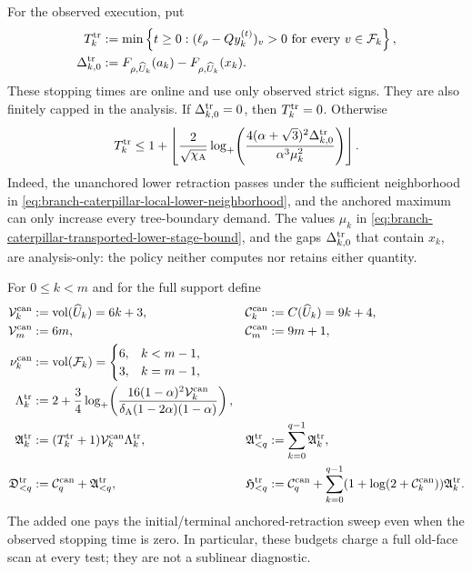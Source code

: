 For the observed execution, put
\begin{align}
 T_k^{\rm tr}
 &:=
 \min\left\{t\geq0:
  (\ell_\rho-Qy_k^{(t)})_v>0
  \text{ for every }v\in\mathcal F_k\right\},
 \notag\\
 \Delta_{k,0}^{\rm tr}
 &:=
 F_{\rho,\widehat U_k}(a_k)
 -F_{\rho,\widehat U_k}(x_k).
 \label{eq:branch-caterpillar-transported-lower-stopping-time}
\end{align}
These stopping times are online and use only observed strict signs.  They are
also finitely capped in the analysis.  If $\Delta_{k,0}^{\rm tr}=0$, then
$T_k^{\rm tr}=0$.  Otherwise
\begin{equation}
 T_k^{\rm tr}\leq
 1+\left\lfloor\frac{2}{\sqrt{\chi_{\rm A}}}
 \log_+\!\left(
 \frac{4(\alpha+\sqrt3)^2\Delta_{k,0}^{\rm tr}}
      {\alpha^3\mu_k^2}
           \right)\right\rfloor.
 \label{eq:branch-caterpillar-transported-lower-stage-bound}
\end{equation}
Indeed, the unanchored lower retraction passes under the sufficient
neighborhood in
\cref{eq:branch-caterpillar-local-lower-neighborhood}, and the anchored
maximum can only increase every tree-boundary demand.  The values $\mu_k$ in
\cref{eq:branch-caterpillar-transported-lower-stage-bound}, and the gaps
$\Delta_{k,0}^{\rm tr}$ that contain $x_k$, are analysis-only: the policy
neither computes nor retains either quantity.

For $0\leq k<m$ and for the full support define
\begin{align}
 \mathcal V_k^{\rm can}
 &:=\operatorname{vol}(\widehat U_k)=6k+3,
 &
 \mathcal C_k^{\rm can}
 &:=C(\widehat U_k)=9k+4,
 \notag\\
 \mathcal V_m^{\rm can}&:=6m,
 &
 \mathcal C_m^{\rm can}&:=9m+1,
 \notag\\
 \nu_k^{\rm can}
 &:=\operatorname{vol}(\mathcal F_k)
 =\begin{cases}6,&k<m-1,\\3,&k=m-1,\end{cases}
 \label{eq:branch-caterpillar-transported-lower-face-counts}\\
 \Lambda_k^{\rm tr}
 &:=2+\frac34\log_+\!\left(
  \frac{16(1-\alpha)^2\mathcal V_k^{\rm can}}
       {\delta_{\rm A}(1-2\alpha)(1-\alpha)}
                         \right),
 \notag\\
 \mathfrak A_k^{\rm tr}
 &:=(T_k^{\rm tr}+1)\mathcal V_k^{\rm can}\Lambda_k^{\rm tr},
 &
 \mathfrak A_{<q}^{\rm tr}
 &:=\sum_{k=0}^{q-1}\mathfrak A_k^{\rm tr},
 \notag\\
 \mathfrak D_{<q}^{\rm tr}
 &:=\mathcal C_q^{\rm can}+\mathfrak A_{<q}^{\rm tr},
 &
 \mathfrak H_{<q}^{\rm tr}
 &:=\mathcal C_q^{\rm can}
  +\sum_{k=0}^{q-1}
   (1+\log(2+\mathcal C_k^{\rm can}))\mathfrak A_k^{\rm tr}.
 \label{eq:branch-caterpillar-transported-lower-budgets}
\end{align}
The added one pays the initial/terminal anchored-retraction sweep even when
the observed stopping time is zero.  In particular, these budgets charge a
full old-face scan at every test; they are not a sublinear diagnostic.

